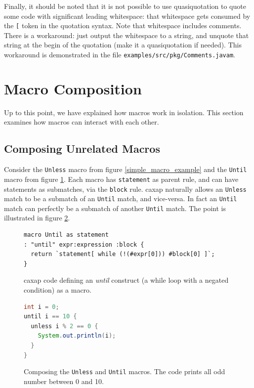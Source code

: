   Finally, it should be noted that it is not possible to use quasiquotation to
  quote some code with significant leading whitespace: that whitespace gets
  consumed by the \texttt{[} token in the quotation syntax. Note that whitespace
  includes comments. There is a workaround: just output the whitespace to a
  string, and unquote that string at the begin of the quotation (make it a
  quasiquotation if needed). This workaround is demonstrated in the file
  \texttt{examples/src/pkg/Comments.javam}.

\section{Macro Composition}

Up to this point, we have explained how macros work in isolation. This section
examines how macros can interact with each other.

\subsection{Composing Unrelated Macros}


Consider the \texttt{Unless} macro from figure \ref{simple_macro_example} and
the \texttt{Until} macro from figure \ref{until_macro}. Each macro has
\texttt{statement} as parent rule, and can have statements as submatches, via
the \texttt{block} rule. caxap naturally allows an \texttt{Unless} match to be a
submatch of an \texttt{Until} match, and vice-versa. In fact an \texttt{Until}
match can perfectly be a submatch of another \texttt{Until} match. The point is
illustrated in figure \ref{composition_example}.

\begin{figure}[here]
\small
\begin{lstlisting}[frame=single,language=caxap]
macro Until as statement
: "until" expr:expression :block {
  return `statement[ while (!(#expr[0])) #block[0] ]`;
}
\end{lstlisting}
\caption{caxap code defining an \emph{until} construct (a while loop with a
  negated condition) as a macro.}
\label{until_macro}
\end{figure}

\begin{figure}[here]
\small
\begin{lstlisting}[frame=single,language=Java]
int i = 0;
until i == 10 {
  unless i % 2 == 0 {
    System.out.println(i);
  }
}
\end{lstlisting}
\caption{Composing the \texttt{Unless} and \texttt{Until} macros. The code
  prints all odd number between 0 and 10.}
\label{composition_example}
\end{figure}

